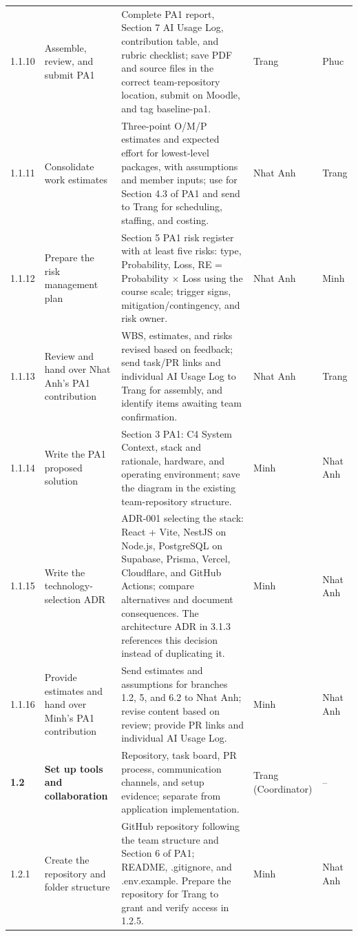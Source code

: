 \documentclass[11pt]{article}
\begin{document}
\begin{longtable}{@{}L{1.15cm}L{3.2cm}L{7.6cm}L{1.4cm}L{1.4cm}@{}}
1.1.10 & Assemble, review, and submit PA1 & Complete PA1 report, Section 7 AI Usage Log, contribution table, and rubric checklist; save PDF and source files in the correct team-repository location, submit on Moodle, and tag baseline-pa1. & Trang & Phuc \\
1.1.11 & Consolidate work estimates & Three-point O/M/P estimates and expected effort for lowest-level packages, with assumptions and member inputs; use for Section 4.3 of PA1 and send to Trang for scheduling, staffing, and costing. & Nhat Anh & Trang \\
1.1.12 & Prepare the risk management plan & Section 5 PA1 risk register with at least five risks: type, Probability, Loss, RE = Probability $\times$ Loss using the course scale; trigger signs, mitigation/contingency, and risk owner. & Nhat Anh & Minh \\
1.1.13 & Review and hand over Nhat Anh's PA1 contribution & WBS, estimates, and risks revised based on feedback; send task/PR links and individual AI Usage Log to Trang for assembly, and identify items awaiting team confirmation. & Nhat Anh & Trang \\
1.1.14 & Write the PA1 proposed solution & Section 3 PA1: C4 System Context, stack and rationale, hardware, and operating environment; save the diagram in the existing team-repository structure. & Minh & Nhat Anh \\
1.1.15 & Write the technology-selection ADR & ADR-001 selecting the stack: React + Vite, NestJS on Node.js, PostgreSQL on Supabase, Prisma, Vercel, Cloudflare, and GitHub Actions; compare alternatives and document consequences. The architecture ADR in 3.1.3 references this decision instead of duplicating it. & Minh & Nhat Anh \\
1.1.16 & Provide estimates and hand over Minh's PA1 contribution & Send estimates and assumptions for branches 1.2, 5, and 6.2 to Nhat Anh; revise content based on review; provide PR links and individual AI Usage Log. & Minh & Nhat Anh \\
\textbf{1.2} & \textbf{Set up tools and collaboration} & Repository, task board, PR process, communication channels, and setup evidence; separate from application implementation. & Trang (Coordinator) & -- \\
1.2.1 & Create the repository and folder structure & GitHub repository following the team structure and Section 6 of PA1; README, .gitignore, and .env.example. Prepare the repository for Trang to grant and verify access in 1.2.5. & Minh & Nhat Anh \\

\end{longtable}
\end{document}
